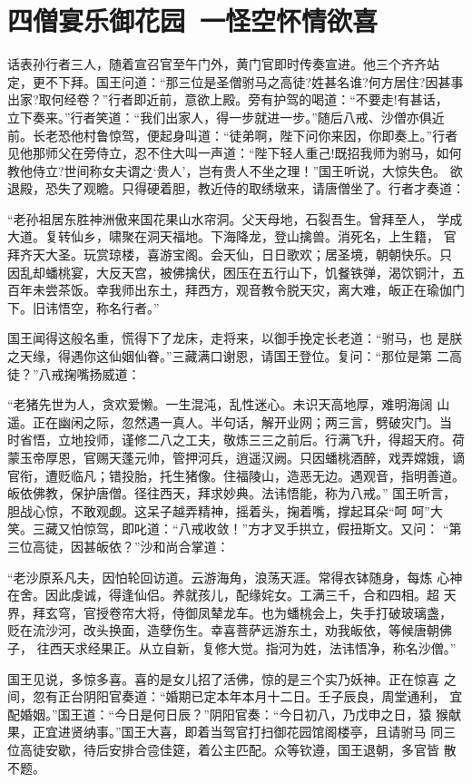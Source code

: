 \chapter{四僧宴乐御花园~一怪空怀情欲喜}

话表孙行者三人，随着宣召官至午门外，黄门官即时传奏宣进。他三个齐齐站
定，更不下拜。国王问道：“那三位是圣僧驸马之高徒?姓甚名谁?何方居住?因甚事
出家?取何经卷？”行者即近前，意欲上殿。旁有护驾的喝道：“不要走!有甚话，
立下奏来。”行者笑道：“我们出家人，得一步就进一步。”随后八戒、沙僧亦俱近
前。长老恐他村鲁惊驾，便起身叫道：“徒弟啊，陛下问你来因，你即奏上。”行者
见他那师父在旁侍立，忍不住大叫一声道：“陛下轻人重己!既招我师为驸马，如何
教他侍立?世间称女夫谓之‘贵人’，岂有贵人不坐之理！”国王听说，大惊失色。
欲退殿，恐失了观瞻。只得硬着胆，教近侍的取绣墩来，请唐僧坐了。行者才奏道：

“老孙祖居东胜神洲傲来国花果山水帘洞。父天母地，石裂吾生。曾拜至人，
学成大道。复转仙乡，啸聚在洞天福地。下海降龙，登山擒兽。消死名，上生籍，
官拜齐天大圣。玩赏琼楼，喜游宝阁。会天仙，日日歌欢；居圣境，朝朝快乐。只
因乱却蟠桃宴，大反天宫，被佛擒伏，困压在五行山下，饥餐铁弹，渴饮铜汁，五
百年未尝茶饭。幸我师出东土，拜西方，观音教令脱天灾，离大难，皈正在瑜伽门
下。旧讳悟空，称名行者。”

国王闻得这般名重，慌得下了龙床，走将来，以御手挽定长老道：“驸马，也
是朕之天缘，得遇你这仙姻仙眷。”三藏满口谢恩，请国王登位。复问：“那位是第
二高徒？”八戒掬嘴扬威道：

“老猪先世为人，贪欢爱懒。一生混沌，乱性迷心。未识天高地厚，难明海阔
山遥。正在幽闲之际，忽然遇一真人。半句话，解开业网；两三言，劈破灾门。当
时省悟，立地投师，谨修二八之工夫，敬炼三三之前后。行满飞升，得超天府。荷
蒙玉帝厚恩，官赐天蓬元帅，管押河兵，逍遥汉阙。只因蟠桃酒醉，戏弄嫦娥，谪
官衔，遭贬临凡；错投胎，托生猪像。住福陵山，造恶无边。遇观音，指明善道。
皈依佛教，保护唐僧。径往西天，拜求妙典。法讳悟能，称为八戒。”
国王听言，胆战心惊，不敢观觑。这呆子越弄精神，摇着头，掬着嘴，撑起耳朵“呵
呵”大笑。三藏又怕惊驾，即叱道：“八戒收敛！”方才叉手拱立，假扭斯文。又问：
“第三位高徒，因甚皈依？”沙和尚合掌道：

“老沙原系凡夫，因怕轮回访道。云游海角，浪荡天涯。常得衣钵随身，每炼
心神在舍。因此虔诚，得逢仙侣。养就孩儿，配缘姹女。工满三千，合和四相。超
天界，拜玄穹，官授卷帘大将，侍御凤辇龙车。也为蟠桃会上，失手打破玻璃盏，
贬在流沙河，改头换面，造孽伤生。幸喜菩萨远游东土，劝我皈依，等候唐朝佛子，
往西天求经果正。从立自新，复修大觉。指河为姓，法讳悟净，称名沙僧。”

国王见说，多惊多喜。喜的是女儿招了活佛，惊的是三个实乃妖神。正在惊喜
之间，忽有正台阴阳官奏道：“婚期已定本年本月十二日。壬子辰良，周堂通利，
宜配婚姻。”国王道：“今日是何日辰？”阴阳官奏：“今日初八，乃戊申之日，猿
猴献果，正宜进贤纳事。”国王大喜，即着当驾官打扫御花园馆阁楼亭，且请驸马
同三位高徒安歇，待后安排合卺佳筵，着公主匹配。众等钦遵，国王退朝，多官皆
散不题。

